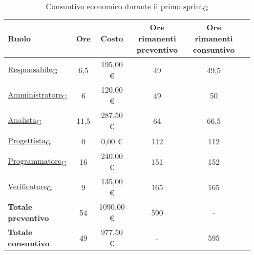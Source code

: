 \begin{table}[!h]
	\centering
	\begin{tabular}{ | l | c | c | c | c | c | }
		\hline
		\textbf{Ruolo}             & \textbf{Ore} & \textbf{Costo} & \textbf{Ore rimanenti preventivo} & \textbf{Ore rimanenti consuntivo} \\
		\hline
		\href{https://7last.github.io/docs/rtb/documentazione-interna/glossario\#responsabile}{Responsabile\textsubscript{G}}               & 6,5          & 195,00 €       & 49                                & 49,5                              \\
		\href{https://7last.github.io/docs/rtb/documentazione-interna/glossario\#amministratore}{Amministratore\textsubscript{G}}             & 6            & 120,00 €       & 49                                & 50                                \\
		\href{https://7last.github.io/docs/rtb/documentazione-interna/glossario\#analista}{Analista\textsubscript{G}}                   & 11,5         & 287,50 €       & 64                                & 66,5                              \\
		\href{https://7last.github.io/docs/rtb/documentazione-interna/glossario\#progettista}{Progettista\textsubscript{G}}                & 0            & 0,00 €         & 112                               & 112                               \\
		\href{https://7last.github.io/docs/rtb/documentazione-interna/glossario\#programmatore}{Programmatore\textsubscript{G}}              & 16           & 240,00 €       & 151                               & 152                               \\
		\href{https://7last.github.io/docs/rtb/documentazione-interna/glossario\#verificatore}{Verificatore\textsubscript{G}}               & 9            & 135,00 €       & 165                               & 165                               \\
		\hline
		\textbf{Totale preventivo} & 54           & 1090,00 €      & 590                               & -                                 \\
		\hline
		\textbf{Totale consuntivo} & 49           & 977,50 €       & -                                 & 595                               \\
		\hline
	\end{tabular}
	\caption{Consuntivo economico durante il primo \href{https://7last.github.io/docs/rtb/documentazione-interna/glossario\#sprint}{sprint\textsubscript{G}}}
	
\end{table}


